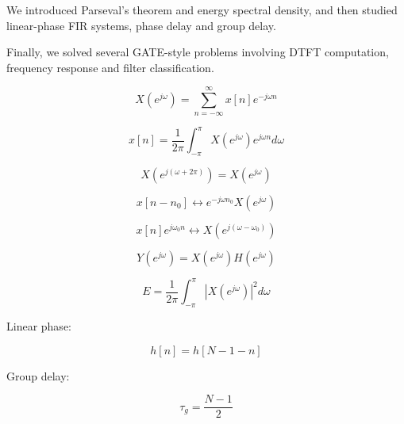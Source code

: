We introduced Parseval’s theorem and energy spectral density, and then studied
linear-phase FIR systems, phase delay and group delay.

Finally, we solved several GATE-style problems involving DTFT computation,
frequency response and filter classification.


\begin{tcolorbox}[title=One-Minute Revision,colback=blue!5]

\[
X(e^{j\omega})=
\sum_{n=-\infty}^{\infty}x[n]e^{-j\omega n}
\]

\[
x[n]=
\frac{1}{2\pi}
\int_{-\pi}^{\pi}
X(e^{j\omega})e^{j\omega n}d\omega
\]

\[
X(e^{j(\omega+2\pi)})=X(e^{j\omega})
\]

\[
x[n-n_0]\leftrightarrow e^{-j\omega n_0}X(e^{j\omega})
\]

\[
x[n]e^{j\omega_0 n}\leftrightarrow X(e^{j(\omega-\omega_0)})
\]

\[
Y(e^{j\omega})=X(e^{j\omega})H(e^{j\omega})
\]

\[
E=
\frac{1}{2\pi}
\int_{-\pi}^{\pi}|X(e^{j\omega})|^2d\omega
\]

Linear phase:

\[
h[n]=h[N-1-n]
\]

Group delay:

\[
\tau_g=\frac{N-1}{2}
\]

\end{tcolorbox}
